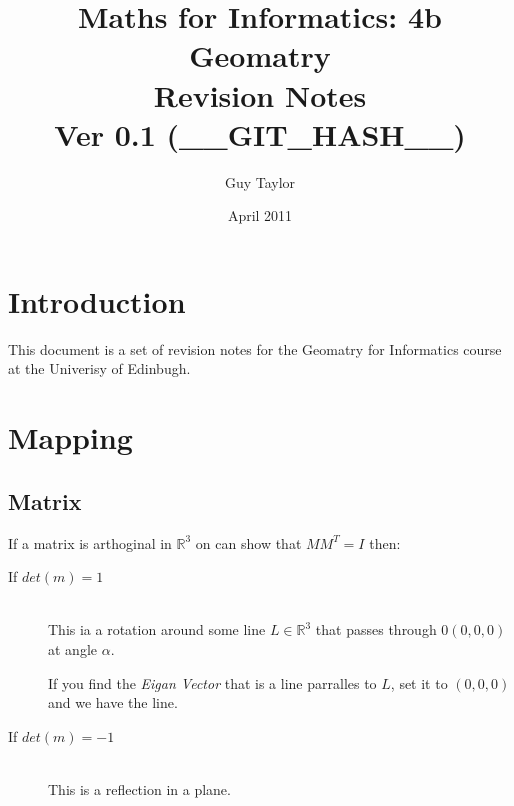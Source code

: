 \documentclass[11pt,twoside,a4paper]{article}
\begin{document}
  
  \graphicspath{{img//}}
  
  \title{Maths for Informatics: 4b Geomatry \\Revision Notes \\ Ver 0.1 (__GIT_HASH__)}
  \author{Guy Taylor}
  \date{April 2011}
  
  \maketitle
  
  \tableofcontents
  
  \section{Introduction}
    This document is a set of revision notes for the Geomatry for Informatics course at the Univerisy of Edinbugh.
  
  \clearpage
  \section{Mapping}
    \subsection{Matrix}
      If a matrix is arthoginal in \(\mathbb{R}^3\) on can show that \(MM^T = I\) then:
      \begin{description}
        \item[If \(det(m) = 1\)] \hfill \\
          This ia a rotation around some line \(L \in \mathbb{R}^3\) that passes through \(0 (0,0,0)\) at angle \(\alpha\).
          
          If you find the \textit{Eigan Vector} that is a line parralles to \(L\), set it to \((0,0,0)\) and we have the line.
        
        \item[If \(det(m) = -1\)] \hfill \\
          This is a reflection in a plane.
      \end{description}
  
\end{document}

